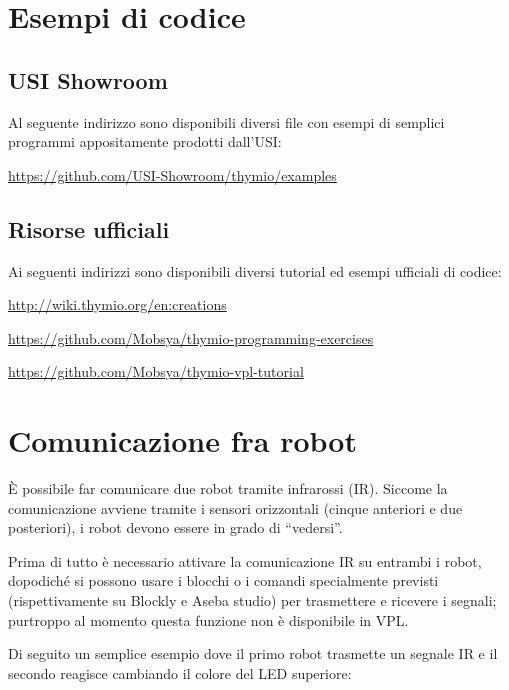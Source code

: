 \documentclass[12pt]{article}
\begin{document}
		
\section{Esempi di codice}

	\subsection{USI Showroom}
		
		Al seguente indirizzo sono disponibili diversi file con esempi di semplici programmi appositamente prodotti dall'USI:
		
		\url{https://github.com/USI-Showroom/thymio/examples}
		
	
	\subsection{Risorse ufficiali}
	
		Ai seguenti indirizzi sono disponibili diversi tutorial ed esempi ufficiali di codice:
	
		\url{http://wiki.thymio.org/en:creations}
		
		\url{https://github.com/Mobsya/thymio-programming-exercises}
		
		\url{https://github.com/Mobsya/thymio-vpl-tutorial}
	
	
\section{Comunicazione fra robot}\label{network}

	È possibile far comunicare due robot tramite infrarossi (IR). Siccome la comunicazione avviene tramite i sensori orizzontali (cinque anteriori e due posteriori), i robot devono essere in grado di ``vedersi''.
	
	Prima di tutto è necessario attivare la comunicazione IR su entrambi i robot, dopodiché si possono usare i blocchi o i comandi specialmente previsti (rispettivamente su Blockly e Aseba studio) per trasmettere e ricevere i segnali; purtroppo al momento questa funzione non è disponibile in VPL. 
	
	Di seguito un semplice esempio dove il primo robot trasmette un segnale IR e il secondo reagisce cambiando il colore del LED superiore: 
	
\end{document}
